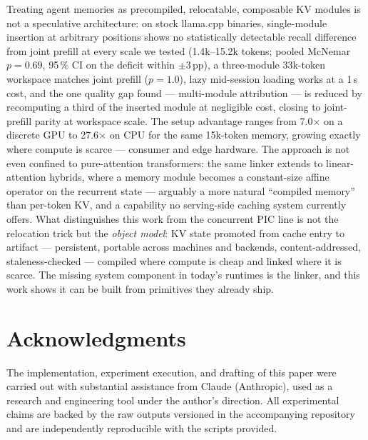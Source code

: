 \documentclass[11pt]{article}
\begin{document}
Treating agent memories as precompiled, relocatable, composable KV modules is not a speculative architecture: on stock llama.cpp binaries, single-module insertion at arbitrary positions shows no statistically detectable recall difference from joint prefill at every scale we tested (1.4k--15.2k tokens; pooled McNemar $p=0.69$, 95\,\% CI on the deficit within $\pm3$\,pp), a three-module 33k-token workspace matches joint prefill ($p=1.0$), lazy mid-session loading works at a 1\,s cost, and the one quality gap found --- multi-module attribution --- is reduced by recomputing a third of the inserted module at negligible cost, closing to joint-prefill parity at workspace scale. The setup advantage ranges from 7.0$\times$ on a discrete GPU to 27.6$\times$ on CPU for the same 15k-token memory, growing exactly where compute is scarce --- consumer and edge hardware. The approach is not even confined to pure-attention transformers: the same linker extends to linear-attention hybrids, where a memory module becomes a constant-size affine operator on the recurrent state --- arguably a more natural ``compiled memory'' than per-token KV, and a capability no serving-side caching system currently offers. What distinguishes this work from the concurrent PIC line is not the relocation trick but the \emph{object model}: KV state promoted from cache entry to artifact --- persistent, portable across machines and backends, content-addressed, staleness-checked --- compiled where compute is cheap and linked where it is scarce. The missing system component in today's runtimes is the linker, and this work shows it can be built from primitives they already ship.

\section*{Acknowledgments}

The implementation, experiment execution, and drafting of this paper were carried out with substantial assistance from Claude (Anthropic), used as a research and engineering tool under the author's direction. All experimental claims are backed by the raw outputs versioned in the accompanying repository and are independently reproducible with the scripts provided.
\end{document}
